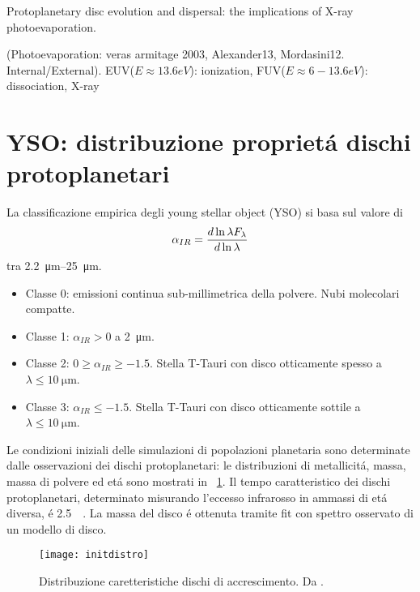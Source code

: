\begin{workout}
Protoplanetary disc evolution and dispersal: the implications of X-ray photoevaporation.
\end{workout}


\begin{workout}
(Photoevaporation: veras armitage 2003, Alexander13, Mordasini12. Internal/External).
EUV($E\approx13.6eV$): ionization, FUV($E\approx6-13.6eV$): dissociation, X-ray
\end{workout}

\section{YSO: distribuzione propriet\'a dischi protoplanetari}

La classificazione empirica degli young stellar object (YSO) si basa sul valore di
\begin{equation}
\alpha_{IR}=\frac{d \ln{\lambda F_{\lambda}}}{d \ln{\lambda}}
\end{equation}
tra \SIrange{2.2}{25}{\micro\meter}.

\begin{itemize}
\item Classe 0: emissioni continua sub-millimetrica della polvere. Nubi molecolari compatte.
\item Classe 1: $\alpha_{IR}>0$ a \SI{2}{\micro\meter}.
\item Classe 2: $0\geq\alpha_{IR}\geq-1.5$. Stella T-Tauri con disco otticamente spesso a $\lambda\leq\SI{10}{\micro\meter}$.
\item Classe 3: $\alpha_{IR}\leq-1.5$. Stella T-Tauri con disco otticamente sottile a $\lambda\leq\SI{10}{\micro\meter}$.
\end{itemize}

Le condizioni iniziali delle simulazioni di popolazioni planetaria sono determinate dalle osservazioni dei dischi protoplanetari: le distribuzioni di metallicit\'a, massa, massa di polvere ed et\'a sono mostrati in ~\ref{fig:initdistro}. Il tempo caratteristico dei dischi protoplanetari, determinato misurando l'eccesso infrarosso in ammassi di et\'a diversa, \'e \SI{2.5}{\mega\year}. La massa del disco \'e ottenuta tramite fit con spettro osservato di un modello di disco.

\begin{figure}[!ht]
\texttt{[image: initdistro]}
\caption{Distribuzione caretteristiche dischi di accrescimento. Da \cite{mordasini2018planetary}.}\label{fig:initdistro}\end{figure}

